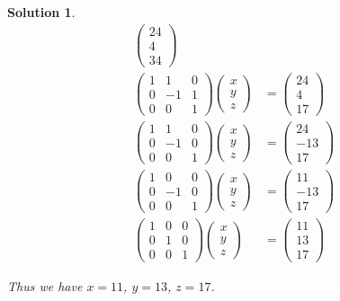 \documentclass{article}
\newtheorem*{solution}{Solution}
\begin{document}
\begin{solution}
\begin{align*}
\begin{pmatrix}
24 \\ 4 \\ 34
\end{pmatrix} \\
\begin{pmatrix}
1 & 1 & 0 \\
0 & -1 & 1 \\
0 & 0 & 1
\end{pmatrix}
\begin{pmatrix}
x \\ y \\ z 
\end{pmatrix}
&= 
\begin{pmatrix}
24 \\ 4 \\ 17
\end{pmatrix} \\
\begin{pmatrix}
1 & 1 & 0 \\
0 & -1 & 0 \\
0 & 0 & 1
\end{pmatrix}
\begin{pmatrix}
x \\ y \\ z 
\end{pmatrix}
&= 
\begin{pmatrix}
24 \\ -13 \\ 17
\end{pmatrix} \\
\begin{pmatrix}
1 & 0 & 0 \\
0 & -1 & 0 \\
0 & 0 & 1
\end{pmatrix}
\begin{pmatrix}
x \\ y \\ z 
\end{pmatrix}
&= 
\begin{pmatrix}
11 \\ -13 \\ 17
\end{pmatrix} \\
\begin{pmatrix}
1 & 0 & 0 \\
0 & 1 & 0 \\
0 & 0 & 1
\end{pmatrix}
\begin{pmatrix}
x \\ y \\ z 
\end{pmatrix}
&= 
\begin{pmatrix}
11 \\ 13 \\ 17
\end{pmatrix}
\end{align*}

Thus we have $x = 11$, $y = 13$, $z = 17$.

\end{solution}
\end{document}
